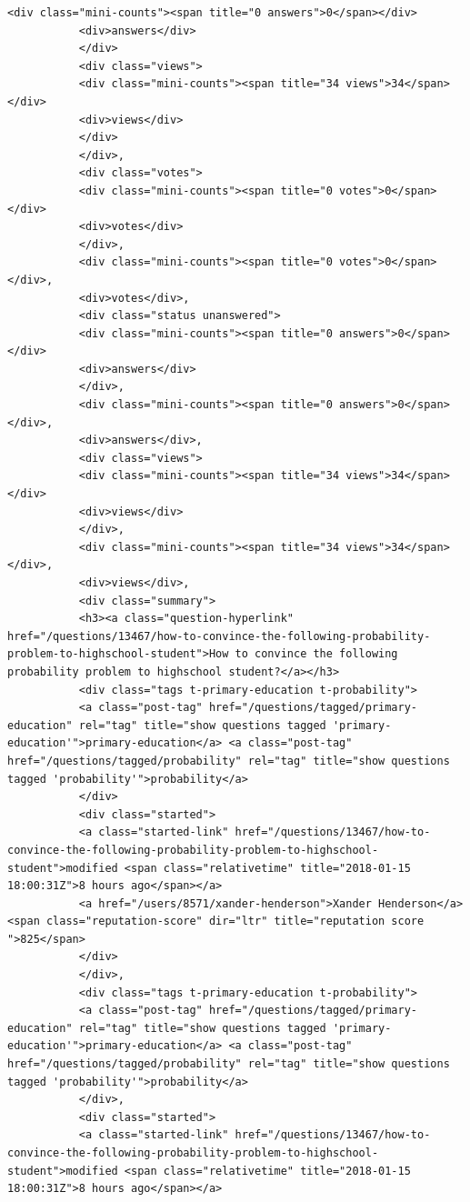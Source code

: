 \documentclass[11pt]{article}
\begin{document}
\begin{Verbatim}[commandchars=\\\{\}]
           <div class="mini-counts"><span title="0 answers">0</span></div>
           <div>answers</div>
           </div>
           <div class="views">
           <div class="mini-counts"><span title="34 views">34</span></div>
           <div>views</div>
           </div>
           </div>,
           <div class="votes">
           <div class="mini-counts"><span title="0 votes">0</span></div>
           <div>votes</div>
           </div>,
           <div class="mini-counts"><span title="0 votes">0</span></div>,
           <div>votes</div>,
           <div class="status unanswered">
           <div class="mini-counts"><span title="0 answers">0</span></div>
           <div>answers</div>
           </div>,
           <div class="mini-counts"><span title="0 answers">0</span></div>,
           <div>answers</div>,
           <div class="views">
           <div class="mini-counts"><span title="34 views">34</span></div>
           <div>views</div>
           </div>,
           <div class="mini-counts"><span title="34 views">34</span></div>,
           <div>views</div>,
           <div class="summary">
           <h3><a class="question-hyperlink" href="/questions/13467/how-to-convince-the-following-probability-problem-to-highschool-student">How to convince the following probability problem to highschool student?</a></h3>
           <div class="tags t-primary-education t-probability">
           <a class="post-tag" href="/questions/tagged/primary-education" rel="tag" title="show questions tagged 'primary-education'">primary-education</a> <a class="post-tag" href="/questions/tagged/probability" rel="tag" title="show questions tagged 'probability'">probability</a>
           </div>
           <div class="started">
           <a class="started-link" href="/questions/13467/how-to-convince-the-following-probability-problem-to-highschool-student">modified <span class="relativetime" title="2018-01-15 18:00:31Z">8 hours ago</span></a>
           <a href="/users/8571/xander-henderson">Xander Henderson</a> <span class="reputation-score" dir="ltr" title="reputation score ">825</span>
           </div>
           </div>,
           <div class="tags t-primary-education t-probability">
           <a class="post-tag" href="/questions/tagged/primary-education" rel="tag" title="show questions tagged 'primary-education'">primary-education</a> <a class="post-tag" href="/questions/tagged/probability" rel="tag" title="show questions tagged 'probability'">probability</a>
           </div>,
           <div class="started">
           <a class="started-link" href="/questions/13467/how-to-convince-the-following-probability-problem-to-highschool-student">modified <span class="relativetime" title="2018-01-15 18:00:31Z">8 hours ago</span></a>

\end{Verbatim}
\end{document}
